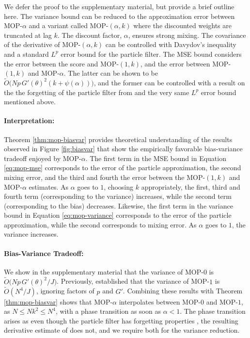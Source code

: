\documentclass[9pt,twocolumn,pnasresearcharticle]{pnas-new}
\newcommand\arxiv[2]{#2} %
\begin{document}
We defer the proof to \arxiv{Appendix~\ref{appendix:biasvar}}{the supplementary material}, but provide a brief outline here. 
The variance bound can be reduced to the approximation error between MOP-$\alpha$ and a variant called MOP-$(\alpha,k)$ where the discounted weights are truncated at lag $k$. 
The discount factor, $\alpha$, ensures strong mixing.
The covariance of the derivative of MOP-$(\alpha,k)$ can be controlled with Davydov's inequality and a standard $L^p$ error bound for the particle filter. 
The MSE bound considers the error between the score and MOP-$(1,k)$, and the error between MOP-$(1,k)$ and MOP-$\alpha$. 
The latter can be shown to be $\tilde{O}\big(Np \, G'(\theta)^2(k+\psi(\alpha))\big)$, and the former can be controlled with a result on the the forgetting of the particle filter from \cite{karjalainen23} and the very same $L^p$ error bound mentioned above. 

\paragraph{Interpretation:} Theorem \ref{thm:mop-biasvar} provides theoretical understanding of the results observed in Figure \ref{fig:biasvar} that show the empirically favorable bias-variance tradeoff enjoyed by MOP-$\alpha$.
The first term in the MSE bound in Equation \ref{eq:mop-mse} corresponds to the error of the particle approximation, the second mixing error, and the third and fourth the error between the MOP-$(1,k)$ and MOP-$\alpha$ estimates. 
As $\alpha$ goes to $1$, choosing $k$ appropriately, the first, third and fourth term (corresponding to the variance) increases, while the second term (corresponding to the bias) decreases. 
Likewise, the first term in the variance bound in Equation \ref{eq:mop-variance} corresponds to the error of the particle approximation, while the second corresponds to mixing error. 
As $\alpha$ goes to $1$, the variance increases. 

\paragraph{Bias-Variance Tradeoff:} We show in \arxiv{Appendix~\ref{appendix:biasvar}}{the supplementary material} that the variance of MOP-$0$ is $\tilde{O}\big( Np \, G'(\theta)^2\big/J \big)$.
Previously, \cite{poyiadjis11} established that the variance of MOP-$1$ is $\tilde{O}(N^4/J)$, ignoring factors of $p$ and $G'$. 
Combining these results with Theorem \ref{thm:mop-biasvar} shows that MOP-$\alpha$ interpolates between MOP-$0$ and MOP-$1$, as $N \leq Nk^2 \leq N^4$, with a phase transition as soon as $\alpha<1$. 
The phase transition arises as even though the particle filter has forgetting properties \cite{karjalainen23}, the resulting derivative estimate of \cite{poyiadjis11} does not, and we require both for the variance reduction. 
\end{document}
